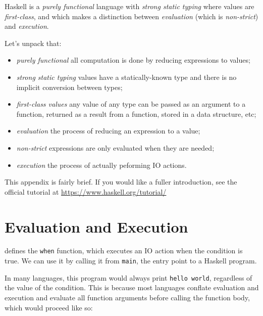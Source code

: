 
\begin{figure}[b]
  \centering
  \hrulefill
  
  \label{fig:when}
\end{figure}

Haskell is a \emph{purely functional} language with \emph{strong static typing}
where values are \emph{first-class}, and which makes a distinction between
\emph{evaluation} (which is \emph{non-strict}) and \emph{execution}.

Let's unpack that:

\begin{itemize}
\item \emph{purely functional} all computation is done by reducing expressions
  to values;
\item \emph{strong static typing} values have a statically-known type and there
  is no implicit conversion between types;
\item \emph{first-class values} any value of any type can be passed as an
  argument to a function, returned as a result from a function, stored in a data
  structure, etc;
\item \emph{evaluation} the process of reducing an expression to a value;
\item \emph{non-strict} expressions are only evaluated when they are needed;
\item \emph{execution} the process of actually peforming IO actions.
\end{itemize}

This appendix is fairly brief.  If you would like a fuller introduction, see the
official tutorial at \url{https://www.haskell.org/tutorial/}

\section*{Evaluation and Execution}

 defines the \verb|when| function, which executes an IO action when
the condition is true.  We can use it by calling it from \verb|main|, the entry
point to a Haskell program.

In many languages, this program would always print \verb|hello world|,
regardless of the value of the condition.  This is because most languages
conflate evaluation and execution and evaluate all function arguments before
calling the function body, which would proceed like so:

